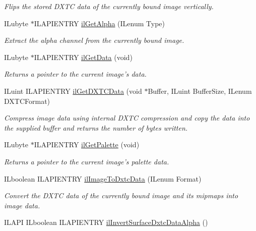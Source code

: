 \begin{DoxyCompactItemize}
\begin{DoxyCompactList}\small\item\em Flips the stored D\-X\-T\-C data of the currently bound image vertically. \end{DoxyCompactList}\item 
I\-Lubyte $\ast$I\-L\-A\-P\-I\-E\-N\-T\-R\-Y \hyperlink{group__data_gaaf70fd0dbf35dd1e31700543c6e763d4}{il\-Get\-Alpha} (I\-Lenum Type)
\begin{DoxyCompactList}\small\item\em Extract the alpha channel from the currently bound image. \end{DoxyCompactList}\item 
I\-Lubyte $\ast$I\-L\-A\-P\-I\-E\-N\-T\-R\-Y \hyperlink{group__data_ga7935a3b79dcdc71ee0f682854939dcc9}{il\-Get\-Data} (void)
\begin{DoxyCompactList}\small\item\em Returns a pointer to the current image's data. \end{DoxyCompactList}\item 
I\-Luint I\-L\-A\-P\-I\-E\-N\-T\-R\-Y \hyperlink{group__data_ga4ae3b92dd5e43a62dd44b3ee9d85087f}{il\-Get\-D\-X\-T\-C\-Data} (void $\ast$Buffer, I\-Luint Buffer\-Size, I\-Lenum D\-X\-T\-C\-Format)
\begin{DoxyCompactList}\small\item\em Compress image data using internal D\-X\-T\-C compression and copy the data into the supplied buffer and returns the number of bytes written. \end{DoxyCompactList}\item 
I\-Lubyte $\ast$I\-L\-A\-P\-I\-E\-N\-T\-R\-Y \hyperlink{group__data_gaffc60ac194afa1ed9d1bdc266adc5d29}{il\-Get\-Palette} (void)
\begin{DoxyCompactList}\small\item\em Returns a pointer to the current image's palette data. \end{DoxyCompactList}\item 
\hypertarget{group__data_gaa7c7b55455ab5af387502a4cf4ede91f}{I\-Lboolean I\-L\-A\-P\-I\-E\-N\-T\-R\-Y \hyperlink{group__data_gaa7c7b55455ab5af387502a4cf4ede91f}{il\-Image\-To\-Dxtc\-Data} (I\-Lenum Format)}\label{group__data_gaa7c7b55455ab5af387502a4cf4ede91f}

\begin{DoxyCompactList}\small\item\em Convert the D\-X\-T\-C data of the currently bound image and its mipmaps into image data. \end{DoxyCompactList}\item 
\hypertarget{group__data_ga895ded17dd75715105a64dddb78f9790}{I\-L\-A\-P\-I I\-Lboolean I\-L\-A\-P\-I\-E\-N\-T\-R\-Y \hyperlink{group__data_ga895ded17dd75715105a64dddb78f9790}{il\-Invert\-Surface\-Dxtc\-Data\-Alpha} ()}\label{group__data_ga895ded17dd75715105a64dddb78f9790}


\end{DoxyCompactItemize}
